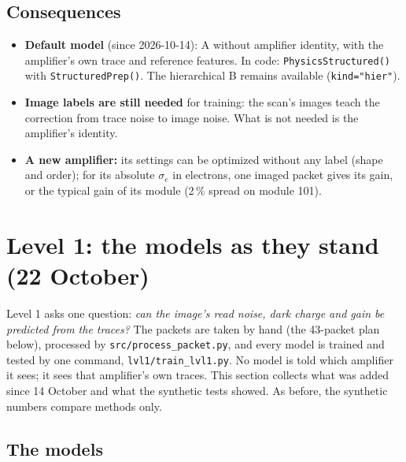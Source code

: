 \documentclass[10pt]{article}
\newcommand{\code}[1]{\texttt{#1}}
\begin{document}
\subsection{Consequences}
\begin{itemize}
\item \textbf{Default model} (since 2026-10-14): A without amplifier identity, with the amplifier's own trace and reference
  features. In code: \code{PhysicsStructured()} with \code{StructuredPrep()}. The hierarchical B remains available
  (\code{kind="hier"}).
\item \textbf{Image labels are still needed} for training: the scan's images teach the correction from trace noise to image noise. What is
  not needed is the amplifier's identity.
\item \textbf{A new amplifier:} its settings can be optimized without any label (shape and order); for its absolute $\sigma_e$ in electrons,
  one imaged packet gives its gain, or the typical gain of its module (2\,\% spread on module 101).
\end{itemize}


\clearpage
\section{Level 1: the models as they stand (22 October)}
\label{sec:lvl1}

\begin{basic}
Level 1 asks one question: \emph{can the image's read noise, dark charge and gain be predicted from the traces?} The packets are taken by
hand (the 43-packet plan below), processed by \code{src/process\_packet.py}, and every model is trained and tested by one command,
\code{lvl1/train\_lvl1.py}. No model is told which amplifier it sees; it sees that amplifier's own traces. This section collects
what was added since 14 October and what the synthetic tests showed. As before, the synthetic numbers compare methods only.
\end{basic}

\subsection{The models}
\label{sec:lvl1models}
\end{document}
